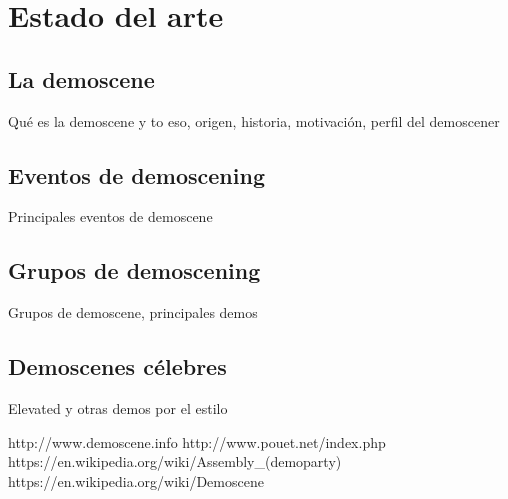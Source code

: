 
\chapter{Estado del arte}

\section{La demoscene}

Qué es la demoscene y to eso, origen, historia, motivación, perfil del demoscener

\section{Eventos de demoscening}

Principales eventos de demoscene

\section{Grupos de demoscening}

Grupos de demoscene, principales demos

\section{Demoscenes célebres}

Elevated y otras demos por el estilo

http://www.demoscene.info
http://www.pouet.net/index.php
https://en.wikipedia.org/wiki/Assembly_(demoparty)
https://en.wikipedia.org/wiki/Demoscene